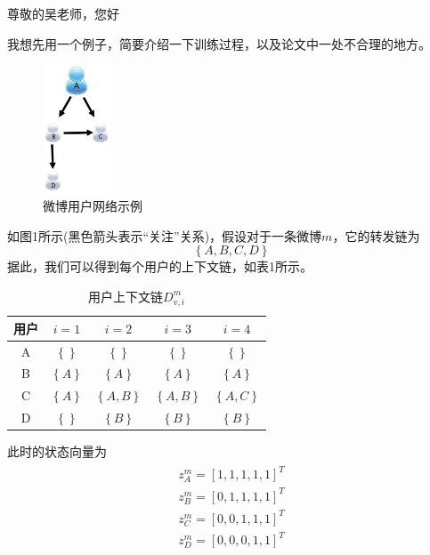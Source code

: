 \documentclass[UTF8]{ctexart}
\begin{document}
\par 尊敬的吴老师，您好
\newline
\par
我想先用一个例子，简要介绍一下训练过程，以及论文中一处不合理的地方。
\begin{figure}[h!]
    \centering
    \includegraphics[width=2cm]{social_influence.jpg}
    \caption{微博用户网络示例}
    \label{fig-sample}
\end{figure}
\par 如图1所示(黑色箭头表示“关注”关系)，假设对于一条微博$m$，它的转发链为
\begin{equation*}
\left \{ A,B,C,D \right \}
\end{equation*}
据此，我们可以得到每个用户的上下文链，如表1所示。
\begin{table}[!hbp]
\centering
\begin{tabular}{|c|c|c|c|c|}
\hline
\hline
 用户 &  $i=1$ &  $i=2$ &  $i=3$ &  $i=4$ \\
\hline
 A &  $\left \{  \right \}$ &  $\left \{  \right \}$ & $\left \{  \right \}$  &  $\left \{  \right \} $\\
\hline
 B &  $\left \{ A \right \}$ &  $\left \{ A \right \}$ &  $\left \{ A \right \}$ &  $\left \{ A \right \}$ \\
\hline
 C &  $\left \{ A \right \}$ &  $\left \{ A,B \right \}$ &  $\left \{ A,B \right \}$ &  $\left \{ A,C \right \}$ \\
\hline
 D &  $\left \{  \right \}$ &  $\left \{ B \right \}$ &  $\left \{ B \right \}$ &  $\left \{ B \right \}$ \\
 \hline
\hline
\end{tabular}
\caption{用户上下文链$D_{v,i}^{m}$}
\end{table}
\par 此时的状态向量为
\begin{equation*}
\begin{matrix}
\begin{aligned}
z_{A}^{m} = \left [ 1,1,1,1,1 \right ]^{T} \\
z_{B}^{m} = \left [ 0,1,1,1,1 \right ]^{T} \\
z_{C}^{m} = \left [ 0,0,1,1,1 \right ]^{T} \\
z_{D}^{m} = \left [ 0,0,0,1,1 \right ]^{T} \\
\end{aligned}
\end{matrix}
\end{equation*}
\end{document}
